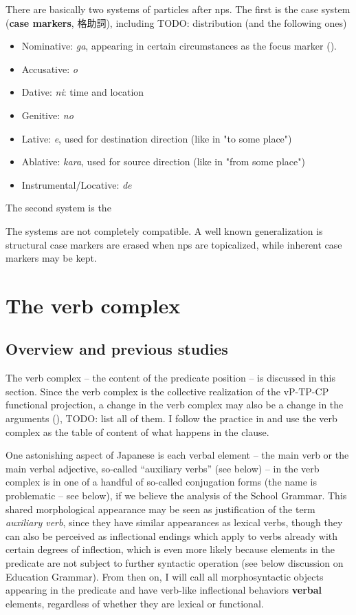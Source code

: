\documentclass[UTF8, a4paper, oneside, scheme=plain]{ctexart}
\newcommand*{\concept}[1]{\textbf{#1}}
\newcommand*{\term}[1]{\emph{#1}}
\newcommand{\corpus}[1]{\emph{#1}}
\begin{document}
There are basically two systems of particles after \ac{np}s.
The first is the case system (\concept{case markers}, 格助詞), including
TODO: distribution (and the following ones)
\begin{itemize}
    \item Nominative: \corpus{ga}, 
    appearing in certain circumstances as the focus marker ().
    \item Accusative: \corpus{o}
    \item Dative: \corpus{ni}: time and location 
    \item Genitive: \corpus{no} 
    \item Lative: \corpus{e}, used for destination direction (like in "to some place")
    \item Ablative: \corpus{kara}, used for source direction (like in "from some place")
    \item Instrumental/Locative: \corpus{de}
\end{itemize}

The second system is the 

The systems are not completely compatible.
A well known generalization is structural case markers are erased when \ac{np}s are topicalized,
while inherent case markers may be kept.


\section{The verb complex}

\subsection{Overview and previous studies}\label{sec:verb-complex-overview}

The verb complex -- the content of the predicate position -- is discussed in this section.
Since the verb complex is the collective realization of the vP-TP-CP functional projection,
a change in the verb complex may also be a change in 
the arguments (),
TODO: list all of them.
I follow the practice in \citet{jacques2021grammar}
and use the verb complex as the table of content of what happens in the clause.

One astonishing aspect of Japanese is 
each verbal element -- the main verb or the main verbal adjective, so-called ``auxiliary verbs'' (see below) -- 
in the verb complex is in one of a handful of so-called conjugation forms (the name is problematic -- see below),
if we believe the analysis of the School Grammar.
This shared morphological appearance may be seen as justification of the term \term{auxiliary verb},
since they have similar appearances as lexical verbs,
though they can also be perceived as inflectional endings 
which apply to verbs already with certain degrees of inflection,
which is even more likely 
because elements in the predicate are not subject to further syntactic operation
(see below discussion on Education Grammar).
From then on, I will call all morphosyntactic objects 
appearing in the predicate and have verb-like inflectional behaviors \concept{verbal} elements,
regardless of whether they are lexical or functional.
\end{document}
